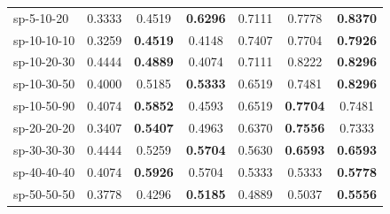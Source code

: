 \begin{table}[!t]
\begin{tabular}{lcccccc}
    sp-5-10-20  & 0.3333 & 0.4519 & \textbf{0.6296} & 0.7111 & 0.7778 &  \textbf{0.8370} \\
    sp-10-10-10 & 0.3259 & \textbf{0.4519} & 0.4148 & 0.7407 & 0.7704 & \textbf{0.7926} \\
    sp-10-20-30                  & 0.4444                           & \textbf{0.4889} & 0.4074                            & 0.7111   & 0.8222                           & \textbf{0.8296} \\
    sp-10-30-50                 & 0.4000                           & 0.5185                           & \textbf{0.5333}  & 0.6519   & 0.7481                           & \textbf{0.8296} \\
    sp-10-50-90  & 0.4074 & \textbf{0.5852} & 0.4593 & 0.6519 & \textbf{0.7704} & 0.7481 \\
    sp-20-20-20 & 0.3407 & \textbf{0.5407} & 0.4963 & 0.6370 & \textbf{0.7556} & 0.7333 \\
    sp-30-30-30 & 0.4444 & 0.5259 & \textbf{0.5704} & 0.5630 & \textbf{0.6593} & \textbf{0.6593} \\
    sp-40-40-40 & 0.4074 & \textbf{0.5926} & 0.5704 & 0.5333 & 0.5333 & \textbf{0.5778} \\
    sp-50-50-50 & 0.3778 & 0.4296 & \textbf{0.5185} & 0.4889 & 0.5037 & \textbf{0.5556} \\
    \hline
    \end{tabular}%
        
    \end{table}
    
